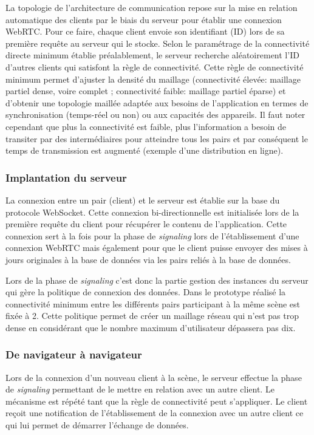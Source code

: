 La topologie de l'architecture de communication repose sur la mise en relation 
automatique des clients par le biais du serveur pour établir une connexion 
\gls{WebRTC}. Pour ce faire, chaque client envoie son identifiant (ID) lors de sa 
première requête au serveur qui le stocke. Selon le paramétrage de la connectivité 
directe minimum établie préalablement, le serveur recherche aléatoirement l'ID 
d'autres clients qui satisfont la règle de connectivité. Cette règle de connectivité 
minimum permet d'ajuster la densité du maillage (connectivité élevée: maillage 
partiel dense, voire complet ; connectivité faible: maillage partiel éparse) et 
d'obtenir une topologie maillée adaptée aux besoins de l'application en termes de 
synchronisation (temps-réel ou non) ou aux capacités des appareils. Il faut noter 
cependant que plus la connectivité est faible, plus l'information a besoin de transiter par des intermédiaires pour atteindre tous les pairs et par conséquent le temps de 
transmission est augmenté (exemple d'une distribution en ligne). 

\subsubsection{Implantation du serveur}
La connexion entre un pair (client) et le serveur est établie sur la base du protocole 
\gls{WebSocket}. Cette connexion bi-directionnelle est initialisée lors de la 
première requête du client pour récupérer le contenu de l'application. Cette 
connexion sert à la fois pour la phase de \textit{signaling} lors de l'établissement 
d'une connexion \gls{WebRTC} mais également pour que le client puisse envoyer 
des mises à jours originales à la base de données via les pairs reliés à la base de 
données. 

Lors de la phase de \textit{signaling} c'est donc la partie gestion des instances du 
serveur qui gère la politique de connexion des données. Dans le prototype réalisé 
la connectivité minimum entre les différents pairs participant à la même scène est 
fixée à 2. Cette politique permet de créer un maillage réseau qui n'est pas trop 
dense en considérant que le nombre maximum d'utilisateur dépassera pas dix.



\subsubsection{De navigateur à navigateur}
Lors de la connexion d'un nouveau client à la scène, le serveur effectue la phase 
de \textit{signaling} permettant de le mettre en relation avec un autre client. Le 
mécanisme est répété tant que la règle de connectivité peut s'appliquer. Le client 
reçoit une notification de l'établissement de la connexion avec un autre client ce 
qui lui permet de démarrer l'échange de données.

